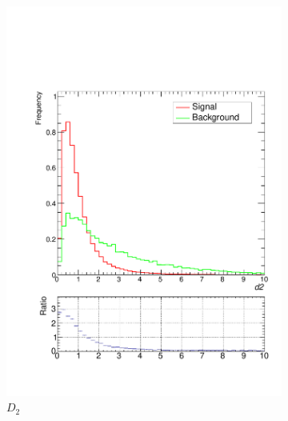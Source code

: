 \documentclass[10pt,a4paper]{book}
\begin{document}
\begin{figure}
\begin{subfigure}{0.5\textwidth}
\includegraphics[scale=0.25]{reco/d2}
\caption{$D_2$}
\end{subfigure}
\begin{subfigure}{.5\textwidth}
\centering

\end{subfigure}
\end{figure}
\end{document}
